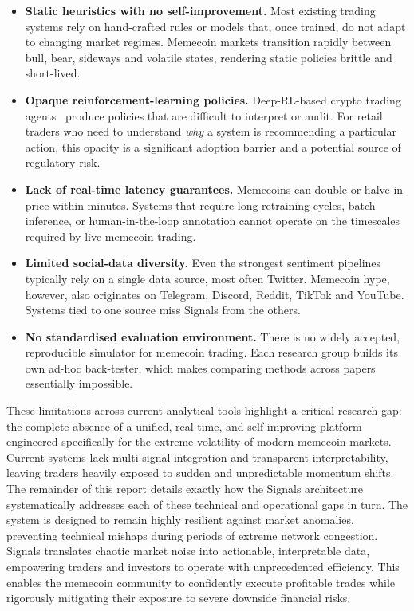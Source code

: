 \documentclass[12pt,a4paper,oneside,openany]{book}
\begin{document}
\begin{itemize}[leftmargin=8mm]
\item \textbf{Static heuristics with no self-improvement.} Most existing trading systems rely on hand-crafted rules or models that, once trained, do not adapt to changing market regimes. Memecoin markets transition rapidly between bull, bear, sideways and volatile states, rendering static policies brittle and short-lived.

\item \textbf{Opaque reinforcement-learning policies.} Deep-RL-based crypto trading agents~\cite{ref14,ref15,ref16} produce policies that are difficult to interpret or audit. For retail traders who need to understand \emph{why} a system is recommending a particular action, this opacity is a significant adoption barrier and a potential source of regulatory risk.

\item \textbf{Lack of real-time latency guarantees.} Memecoins can double or halve in price within minutes. Systems that require long retraining cycles, batch inference, or human-in-the-loop annotation cannot operate on the timescales required by live memecoin trading.

\item \textbf{Limited social-data diversity.} Even the strongest sentiment pipelines typically rely on a single data source, most often Twitter. Memecoin hype, however, also originates on Telegram, Discord, Reddit, TikTok and YouTube. Systems tied to one source miss Signals from the others.

\item \textbf{No standardised evaluation environment.} There is no widely accepted, reproducible simulator for memecoin trading. Each research group builds its own ad-hoc back-tester, which makes comparing methods across papers essentially impossible.
\end{itemize}

These limitations across current analytical tools highlight a critical research gap:
the complete absence of a unified, real-time, and self-improving platform
engineered specifically for the extreme volatility of modern memecoin markets.
Current systems lack multi-signal integration and transparent interpretability,
leaving traders heavily exposed to sudden and unpredictable momentum shifts.
The remainder of this report details exactly how the Signals architecture
systematically addresses each of these technical and operational gaps in turn.
The system is designed to remain highly resilient against market anomalies,
preventing technical mishaps during periods of extreme network congestion.
Signals translates chaotic market noise into actionable, interpretable data,
empowering traders and investors to operate with unprecedented efficiency.
This enables the memecoin community to confidently execute profitable trades
while rigorously mitigating their exposure to severe downside financial risks.
\end{document}
